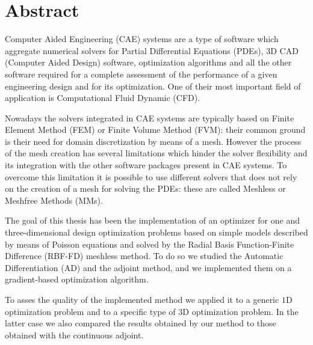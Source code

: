 \chapter{Abstract}

Computer Aided Engineering (CAE) systems are a type of software which aggregate numerical solvers for Partial Differential Equations (PDEs), $3$D CAD (Computer Aided Design) software, optimization algorithms and all the other software required for a complete assessment of the performance of a given engineering design and for its optimization. One of their most important field of application is Computational Fluid Dynamic (CFD).

\medskip
Nowadays the solvers integrated in CAE systems are typically based on Finite Element Method (FEM) or Finite Volume Method (FVM): their common ground is their need for domain discretization by means of a mesh. However the process of the mesh creation has several limitations which hinder the solver flexibility and its integration with the other software packages present in CAE systems.
To overcome this limitation it is possible to use different solvers that does not rely on the creation of a mesh for solving the PDEs: these are called Meshless or Meshfree Methods (MMs).

\medskip
The goal of this thesis has been the implementation of an optimizer for one and three-dimensional design optimization problems based on simple models described by means of Poisson equations and solved by the Radial Basis Function-Finite Difference (RBF-FD) meshless method. To do so we studied the Automatic Differentiation (AD) and the adjoint method, and we implemented them on a gradient-based optimization algorithm.

\medskip
To asses the quality of the implemented method we applied it to a generic $1$D optimization problem and to a specific type of $3$D optimization problem. In the latter case we also compared the results obtained by our method to those obtained with the continuous adjoint.
